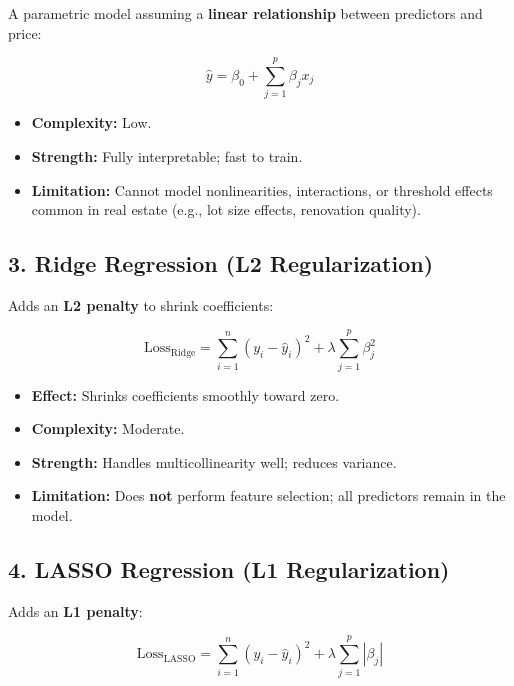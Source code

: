 \documentclass[
  english,
  letterpaper,
  DIV=11,
  numbers=noendperiod]{scrreprt}
\providecommand{\tightlist}{%
  \setlength{\itemsep}{0pt}\setlength{\parskip}{0pt}}
\begin{document}
A parametric model assuming a \textbf{linear relationship} between
predictors and price:

\[
\hat{y} = \beta_0 + \sum_{j=1}^{p} \beta_j x_j
\]

\begin{itemize}
\tightlist
\item
  \textbf{Complexity:} Low.\\
\item
  \textbf{Strength:} Fully interpretable; fast to train.\\
\item
  \textbf{Limitation:} Cannot model nonlinearities, interactions, or
  threshold effects common in real estate (e.g., lot size effects,
  renovation quality).
\end{itemize}

\subsection{3. Ridge Regression (L2
Regularization)}\label{ridge-regression-l2-regularization}

Adds an \textbf{L2 penalty} to shrink coefficients:

\[
\text{Loss}_{\text{Ridge}} = \sum_{i=1}^{n} (y_i - \hat{y}_i)^2 
+ \lambda \sum_{j=1}^{p} \beta_j^2
\]

\begin{itemize}
\tightlist
\item
  \textbf{Effect:} Shrinks coefficients smoothly toward zero.\\
\item
  \textbf{Complexity:} Moderate.\\
\item
  \textbf{Strength:} Handles multicollinearity well; reduces variance.\\
\item
  \textbf{Limitation:} Does \textbf{not} perform feature selection; all
  predictors remain in the model.
\end{itemize}

\subsection{4. LASSO Regression (L1
Regularization)}\label{lasso-regression-l1-regularization}

Adds an \textbf{L1 penalty}:

\[
\text{Loss}_{\text{LASSO}} = \sum_{i=1}^{n} (y_i - \hat{y}_i)^2 
+ \lambda \sum_{j=1}^{p} |\beta_j|
\]
\end{document}
